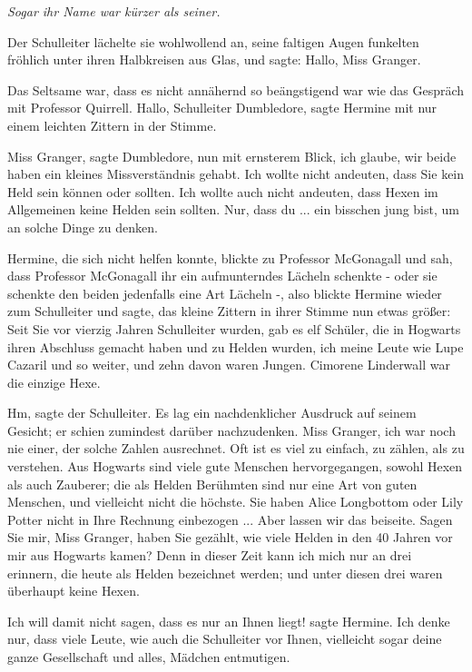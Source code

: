 \emph{Sogar ihr Name war kürzer als seiner.}

Der Schulleiter lächelte sie wohlwollend an, seine faltigen Augen funkelten
fröhlich unter ihren Halbkreisen aus Glas, und sagte: \glqq{}Hallo, Miss
Granger.\grqq{}

Das Seltsame war, dass es nicht annähernd so beängstigend war wie das Gespräch
mit Professor Quirrell. \glqq{}Hallo, Schulleiter Dumbledore\grqq{}, sagte
Hermine mit nur einem leichten Zittern in der Stimme.

\glqq{}Miss Granger\grqq{}, sagte Dumbledore, nun mit ernsterem Blick, \glqq{}ich
glaube, wir beide haben ein kleines Missverständnis gehabt. Ich wollte nicht
andeuten, dass Sie kein Held sein können oder sollten. Ich wollte auch nicht
andeuten, dass Hexen im Allgemeinen keine Helden sein sollten. Nur, dass du ...
ein bisschen jung bist, um an solche Dinge zu denken.\grqq{}

Hermine, die sich nicht helfen konnte, blickte zu Professor McGonagall und sah,
dass Professor McGonagall ihr ein aufmunterndes Lächeln schenkte - oder sie
schenkte den beiden jedenfalls eine Art Lächeln -, also blickte Hermine wieder
zum Schulleiter und sagte, das kleine Zittern in ihrer Stimme nun etwas größer:
\glqq{}Seit Sie vor vierzig Jahren Schulleiter wurden, gab es elf Schüler, die in
Hogwarts ihren Abschluss gemacht haben und zu Helden wurden, ich meine Leute wie
Lupe Cazaril und so weiter, und zehn davon waren Jungen. Cimorene Linderwall war
die einzige Hexe.\grqq{}

\glqq{}Hm\grqq{}, sagte der Schulleiter. Es lag ein nachdenklicher Ausdruck auf
seinem Gesicht; er schien zumindest darüber nachzudenken. \glqq{}Miss Granger,
ich war noch nie einer, der solche Zahlen ausrechnet. Oft ist es viel zu
einfach, zu zählen, als zu verstehen. Aus Hogwarts sind viele gute Menschen
hervorgegangen, sowohl Hexen als auch Zauberer; die als Helden Berühmten sind
nur eine Art von guten Menschen, und vielleicht nicht die höchste. Sie haben
Alice Longbottom oder Lily Potter nicht in Ihre Rechnung einbezogen ... Aber
lassen wir das beiseite. Sagen Sie mir, Miss Granger, haben Sie gezählt, wie
viele Helden in den 40 Jahren vor mir aus Hogwarts kamen? Denn in dieser Zeit
kann ich mich nur an drei erinnern, die heute als Helden bezeichnet werden; und
unter diesen drei waren überhaupt keine Hexen.\grqq{}

\glqq{}Ich will damit nicht sagen, dass es nur an Ihnen liegt!\grqq{} sagte
Hermine. \glqq{}Ich denke nur, dass viele Leute, wie auch die Schulleiter vor
Ihnen, vielleicht sogar deine ganze Gesellschaft und alles, Mädchen
entmutigen.\grqq{}

